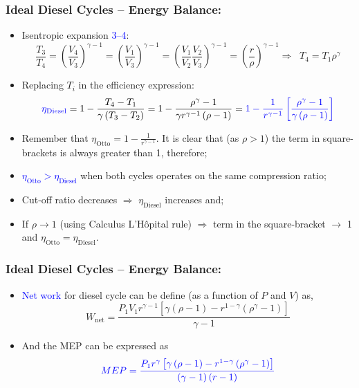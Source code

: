 \documentclass[10pt,compress]{beamer}
\begin{document}
\begin{frame}
 \frametitle{Ideal Diesel Cycles -- Energy Balance:}
 \begin{itemize}
  \item <1-> Isentropic expansion \textcolor{blue}{3--4}:
   \begin{displaymath}
    \displaystyle\frac{T_{3}}{T_{4}} = \left(\displaystyle\frac{V_{4}}{V_{3}}\right)^{\gamma-1} = \left(\displaystyle\frac{V_{1}}{V_{3}}\right)^{\gamma-1}  = \left(\displaystyle\frac{V_{1}}{V_{2}}\displaystyle\frac{V_{2}}{V_{3}}\right)^{\gamma-1}= \left(\displaystyle\frac{r}{\rho}\right)^{\gamma-1} \Longrightarrow \;\; T_{4} = T_{1}\rho^{\gamma}
   \end{displaymath}
  \item <2-> Replacing $T_{i}$ in the efficiency expression:
   \begin{displaymath}
    \textcolor{blue}{\eta_{\text{Diesel}}}= 1 - \displaystyle\frac{T_{4}-T_{1}}{\gamma\left(T_{3}-T_{2}\right)} = 1 - \displaystyle\frac{\rho^{\gamma}-1}{\gamma r^{\gamma-1}\left(\rho-1\right)} =  \textcolor{blue}{1 -\displaystyle\frac{1}{r^{\gamma-1}}\left[\displaystyle\frac{\rho^{\gamma}-1}{\gamma\left(\rho-1\right)}\right]}
   \end{displaymath}
  \item <3-> Remember that $\eta_{\text{Otto}} =1 - \displaystyle\frac{1}{r^{\gamma-1}}$. It is clear that (as $\rho>1$) the term in square-brackets is always greater than 1, therefore;
  \item <4-> \textcolor{blue}{$\eta_{\text{Otto}} > \eta_{\text{Diesel}}$} when both cycles operates on the same compression ratio;
  \item <5-> Cut-off ratio decreases  $\Rightarrow$ $\eta_{\text{Diesel}}$ increases and;
  \item <6-> If $\rho\to 1$ (using Calculus L'H\^opital rule) $\Rightarrow$ term in the square-bracket $\to$ 1 and $\eta_{\text{Otto}} = \eta_{\text{Diesel}}$. 
 \end{itemize}
\end{frame}


\begin{frame}
 \frametitle{Ideal Diesel Cycles -- Energy Balance:}
 \begin{itemize}
  \item <1-> \textcolor{blue}{Net work} for diesel cycle can be define (as a function of $P$ and $V$) as,
    \begin{displaymath}
     W_{\text{net}} = \displaystyle\frac{P_{1}V_{1}r^{\gamma-1}\left[\gamma\left(\rho-1\right)-r^{1-\gamma}\left(\rho^{\gamma}-1\right)\right]}{\gamma-1}
    \end{displaymath}
  \item <2-> And the MEP can be expressed as
    \begin{displaymath}
     \textcolor{blue}{MEP = \displaystyle\frac{P_{1}r^{\gamma}\left[\gamma\left(\rho-1\right)-r^{1-\gamma}\left(\rho^{\gamma}-1\right)\right]}{\left(\gamma-1\right)\left(r-1\right)}}
    \end{displaymath}
 \end{itemize}
\end{frame}
\end{document}
